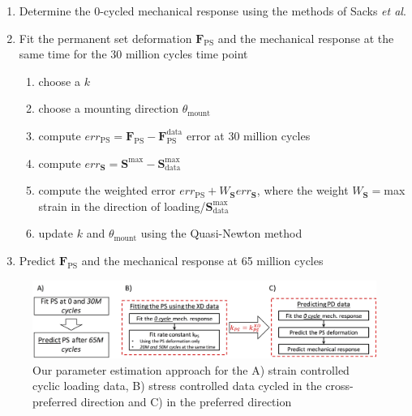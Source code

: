 \begin{enumerate}
\item Determine the 0-cycled mechanical response using the methods of Sacks \textit{et al}.\cite{sacks_novel_2015}
\item Fit the permanent set deformation $\mathbf{F}_\mathrm{PS}$ and the mechanical response at the same time for the 30 million cycles time point
	\begin{enumerate}
	\item choose a $k $
	\item choose a mounting direction $\theta_\mathrm{mount}$
	\item compute $err_\mathrm{PS} = \mathbf{F}_\mathrm{PS} - \mathbf{F}_\mathrm{PS}^\mathrm{data}$ error at 30 million cycles
	\item compute $err_\mathrm{\mathbf{S}} = \mathbf{S}^\mathrm{max} - \mathbf{S}_\mathrm{data}^\mathrm{max}$
	\item compute the weighted error $err_\mathrm{PS} + W_\mathbf{S} err_\mathbf{S}$, where the weight $W_\mathbf{S} = $max strain in the direction of loading/$\mathbf{S}_\mathrm{data}^\mathrm{max}$
	\item update $k $ and $\theta_\mathrm{mount}$ using the Quasi-Newton method \cite{king_dlib_2009}
	\end{enumerate}
\item Predict $\mathbf{F}_\mathrm{PS}$ and the mechanical response at 65 million cycles
\end{enumerate}


\begin{figure}[hbt]
\centering
\centerline{\includegraphics[width=\textwidth]{Images/chapter4/figure12}}
\caption{Our parameter estimation approach for the A) strain controlled cyclic loading data, B) stress controlled data cycled in the cross-preferred direction and C) in the preferred direction}
\label{fig:datamethods}
\end{figure}



